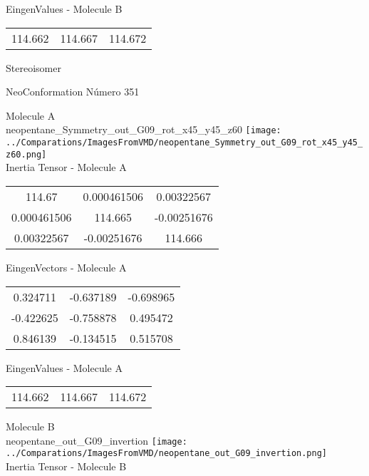\begin{multicols}{2}
\begin{center}
\vtab
 EingenValues - Molecule B     \\
\vtab
\begin{tabular}{|c c c|}
114.662	 & 	114.667	 & 	114.672	 \\
\end{tabular}

\end{center}
\end{multicols}
\begin{center}
\vtab
\vtab
\textcolor{NavyBlue}{\Large Stereoisomer}
\end{center}

 \newpage

\vtab[-2cm]
\begin{center}
{\large NeoConformation \tab Número 351}
\end{center}
\begin{multicols}{2}
\begin{center}

Molecule A \\ 
neopentane\_Symmetry\_out\_G09\_rot\_x45\_y45\_z60
\texttt{[image: ../Comparations/ImagesFromVMD/neopentane\_Symmetry\_out\_G09\_rot\_x45\_y45\_z60.png]}
\\
Inertia Tensor - Molecule A \\
\vtab

\begin{tabular}{|c c c|}
114.67	 & 	0.000461506	 & 	0.00322567	 \\
0.000461506	 & 	114.665	 & 	-0.00251676	 \\
0.00322567	 & 	-0.00251676	 & 	114.666
\end{tabular}

\vtab
 EingenVectors - Molecule A     \\
\vtab
\begin{tabular}{|c c c|}
0.324711	 & 	-0.637189	 & 	-0.698965	 \\
-0.422625	 & 	-0.758878	 & 	0.495472	 \\
0.846139	 & 	-0.134515	 & 	0.515708
\end{tabular}

\vtab
 EingenValues - Molecule A     \\
\vtab
\begin{tabular}{|c c c|}
114.662	 & 	114.667	 & 	114.672	 \\
\end{tabular}
\columnbreak

Molecule B \\ 
neopentane\_out\_G09\_invertion
\texttt{[image: ../Comparations/ImagesFromVMD/neopentane\_out\_G09\_invertion.png]}
\\
Inertia Tensor - Molecule B \\
\vtab


\end{center}
\end{multicols}
